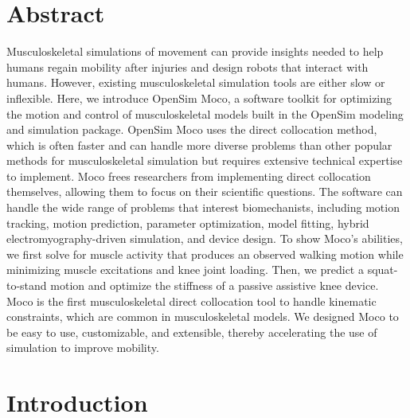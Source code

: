 \documentclass[10pt,letterpaper]{article}
\begin{document}
\section*{Abstract}
Musculoskeletal simulations of movement can provide insights needed to help humans regain mobility after injuries and design robots that interact with humans. However, existing musculoskeletal simulation tools are either slow or inflexible. Here, we introduce OpenSim Moco, a software toolkit for optimizing the motion and control of musculoskeletal models built in the OpenSim modeling and simulation package. OpenSim Moco uses the direct collocation method, which is often faster and can handle more diverse problems than other popular methods for musculoskeletal simulation but requires extensive technical expertise to implement. Moco frees researchers from implementing direct collocation themselves, allowing them to focus on their scientific questions. The software can handle the wide range of problems that interest biomechanists, including motion tracking, motion prediction, parameter optimization, model fitting, hybrid electromyography-driven simulation, and device design. To show Moco’s abilities, we first solve for muscle activity that produces an observed walking motion while minimizing muscle excitations and knee joint loading. Then, we predict a squat-to-stand motion and optimize the stiffness of a passive assistive knee device. Moco is the first musculoskeletal direct collocation tool to handle kinematic constraints, which are common in musculoskeletal models. We designed Moco to be easy to use, customizable, and extensible, thereby accelerating the use of simulation to improve mobility.



\linenumbers

\section*{Introduction}
\end{document}

